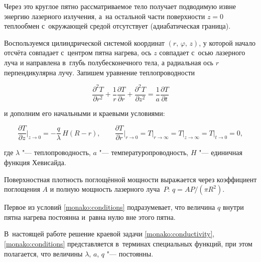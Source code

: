 Через это круглое пятно рассматриваемое тело получает подводимую извне энергию лазерного излучения, а~на остальной части поверхности $z=0$ теплообмен с~окружающей средой отсутствует (адиабатическая граница). 

Воспользуемся цилиндрической системой координат $(r,\,\varphi,\,z)$, у которой начало отсчёта совпадает с~центром пятна нагрева, ось $z$ совпадает с~осью лазерного луча и направлена в~глубь полубесконечного тела, а радиальная ось $r$ перпендикулярна лучу. Запишем уравнение теплопроводности

\begin{equation}

\label{monako:conductivity}

\frac{\partial^2T}{\partial r^2}+\frac{1}{r}\frac{\partial T}{\partial r}+\frac{\partial^2T}{\partial z^2}=\frac{1}{a}\frac{\partial T}{\partial t}

\end{equation}

и дополним его начальными и краевыми условиями:

\begin{equation}

\label{monako:conditions}

\frac{\partial T}{\partial z}\Big|_{z \to  0}=-\frac{q}{\lambda}\,H(R-r), \qquad 

\frac{\partial T}{\partial r}\Big|_{r \to  0}=T\big|_{r\to \infty}= T\big|_{z\to \infty}=T\big|_{t\to 0}=0,

\end{equation}

где $\lambda$ "--- теплопроводность, $a$ "--- температуропроводность, $H$ "--- единичная функция Хевисайда. 

Поверхностная плотность поглощённой мощности   выражается через коэффициент поглощения $A$ и полную мощность лазерного луча~$P$: $q=AP/(\pi R^2)$. 

Первое из условий \eqref{monako:conditions} подразумевает, что величина $ q $ внутри пятна нагрева постоянна и~равна нулю вне этого пятна. 




В~настоящей работе решение краевой задачи \eqref{monako:conductivity}, \eqref{monako:conditions} представляется в~терминах специальных функций, при этом полагается, что величины  $ \lambda $, $ a $, $ q $ "--- постоянны.



